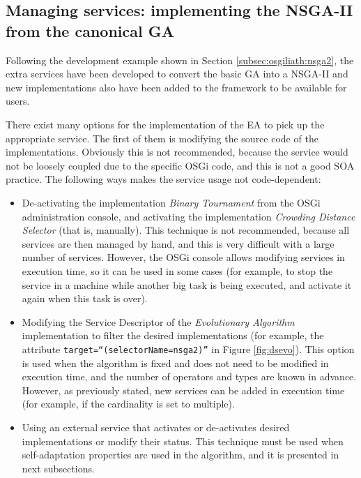 \subsection{Managing services: implementing the NSGA-II from the canonical GA}

Following the development example shown in Section \ref{subsec:osgiliath:nsga2},
the extra services have been developed to convert the basic GA into a
NSGA-II and new implementations also have been added to the framework to be available for
users. %

There exist many options for the implementation of the EA to pick up the appropriate
service. %
 The first of them is modifying the source code of the
 implementations. Obviously this is not recommended, because the
 service would not be loosely coupled due to the specific OSGi code,
 and this is not a good SOA practice. The following ways makes the
 service usage not code-dependent: 


\begin{itemize}
\item De-activating the implementation {\em Binary Tournament} from the OSGi administration console, and activating the implementation {\em Crowding Distance Selector} (that is, manually). This technique is not recommended, because all services are then managed by hand, and this is very difficult with a large number of services. However, the OSGi console allows modifying services in execution time, so it can be used in some cases (for example, to stop the service in a machine while another big task is being executed, and activate it again when this task is over).
\item Modifying the Service Descriptor of the {\em Evolutionary Algorithm} implementation to filter the desired implementations (for example, the attribute \texttt{target\-=``(selectorName\-=nsga2)''} in Figure \ref{fig:dsevo}). This option is used when the algorithm is fixed and does not need to be modified in execution time, and the number of operators and types are known in advance. However, as previously stated, new services can be added in execution time (for example, if the cardinality is set to multiple).
\item Using an external service that activates or de-activates desired implementations or modify their status. This technique must be used when self-adaptation properties are used in the algorithm, and it is presented in next subsections. 
\end{itemize}


